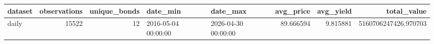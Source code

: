 \begin{tabular}{lrrllrrr}
\toprule
dataset & observations & unique_bonds & date_min & date_max & avg_price & avg_yield & total_value \\
\midrule
daily & 15522 & 12 & 2016-05-04 00:00:00 & 2026-04-30 00:00:00 & 89.666594 & 9.815881 & 5160706247426.970703 \\
\bottomrule
\end{tabular}
